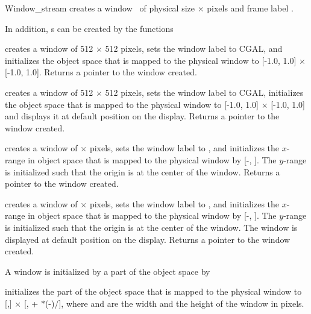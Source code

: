 \begin{ccClass} {Window_stream}
{creates a window \ccVar\ of physical size  $\times$  pixels 
and frame label .}

In addition, \ccClassName s can be created by the functions

{creates a window of 512 $\times$ 512 pixels, sets the window label to
CGAL, and  initializes the object space that is mapped to the physical window to
[-1.0, 1.0] $\times$ [-1.0, 1.0]. 
Returns a pointer to the window created.}

{creates a window of 512 $\times$ 512 pixels, sets the window label to
CGAL, initializes the object space that is mapped to the physical window to 
[-1.0, 1.0] $\times$ [-1.0, 1.0] and 
displays it at default position on the display. Returns a pointer to the window created.}

{creates a window of  $\times$  pixels, sets the window label to
, and  initializes the $x$-range in object space that is mapped to the physical window by
[-, ]. The $y$-range is initialized such that the origin is at
the center of the window. 
Returns a pointer to the window created.}

{creates a window of  $\times$  pixels, sets the window label to
, and initializes the $x$-range in object space that is mapped to the physical window by
[-, ]. The $y$-range is initialized such that the origin is at
the center of the window. The window is displayed at default position on the display. 
Returns a pointer to the window created.}

\ccOperations
A window is initialized by a part of the object space by

{initializes the  part of the object space that is mapped to the physical
window to [,] $\times$ 
[, + $*$(-)/],
where  and  are the width and the height of the window in pixels.}


\end{ccClass}
